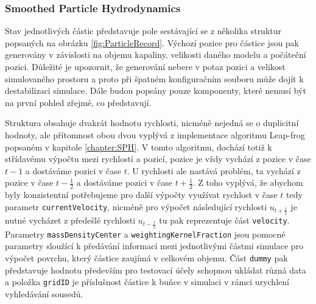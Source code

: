 \subsubsection{Smoothed Particle Hydrodynamics}
Stav jednotlivých částic představuje pole sestávající se z několika struktur popsaných na obrázku \ref{fig:ParticleRecord}. Výchozí pozice pro částice jsou pak generovány v závislosti na objemu kapaliny, velikosti daného modelu a počáteční pozici. Důležité je upozornit, že generování nebere v potaz pozici a velikost simulovaného prostoru a proto při špatném konfiguračním souboru může dojít k destabilizaci simulace.  Dále budou popsány pouze komponenty, které nemusí být na první pohled zřejmé, co představují. 

Struktura obsahuje dvakrát hodnotu rychlosti, nicméně nejedná se o duplicitní hodnoty, ale přítomnost obou dvou vyplývá z implementace algoritmu Leap-frog popsaném v kapitole \ref{chapter:SPH}. V tomto algoritmu, dochází totiž k střídavému výpočtu mezi rychlostí a pozicí, pozice je vždy vychází z pozice v čase $t-1$ a dostáváme pozici v čase $t$. U rychlosti ale nastává problém, ta vychází z pozice v čase $t-\frac{1}{2}$ a dostáváme pozici v čase $t+\frac{1}{2}$. Z toho vyplývá, že abychom byly konzistentní potřebujeme pro další výpočty využívat rychlost v čase $t$ tedy parametr \texttt{currentVelocity}, nicméně pro výpočet následující rychlosti $u_{t+\frac{1}{2}}$ je nutné vycházet z předešlé rychlosti $u_{t-\frac{1}{2}}$ tu pak reprezentuje část \texttt{velocity}. Parametry \texttt{massDensityCenter} a \texttt{weightingKernelFraction} jsou pomocné parametry sloužící k předávání informací mezi jednotlivými částmi simulace pro výpočet povrchu, který částice zaujímá v celkovém objemu. Část \texttt{dummy} pak představuje hodnotu především pro testovací účely schopnou ukládat různá data a položka \texttt{gridID} je příslušnost částice k buňce v simulaci v rámci urychlení vyhledávání sousedů.

